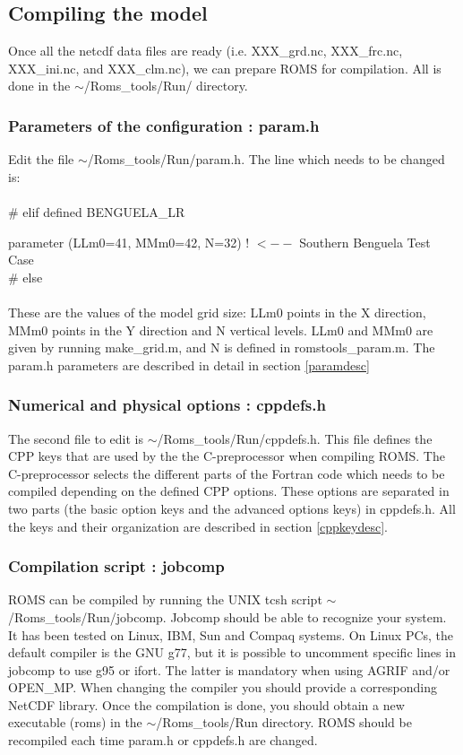 \subsection{Compiling the model}

Once all the netcdf data files are ready (i.e. XXX\_grd.nc,
XXX\_frc.nc, XXX\_ini.nc, and XXX\_clm.nc), we can prepare ROMS for
compilation. All is done in the $\sim$/Roms\_tools/Run/ directory.

\subsubsection{Parameters of the configuration : param.h}
Edit the file $\sim$/Roms\_tools/Run/param.h.
The line which needs to be changed is:\\\\
\# elif defined BENGUELA\_LR

parameter (LLm0=41, MMm0=42, N=32)  ! $<--$ Southern Benguela Test Case\\
\#  else\\
\\
These are the values of the model grid size: LLm0 points in the X direction, MMm0
points in the Y direction and N vertical levels.  LLm0 and MMm0 are given by running
make\_grid.m, and N is defined in romstools\_param.m. The param.h parameters are
described in detail in section \ref{paramdesc}

\subsubsection{Numerical and physical options : cppdefs.h}
The second file to edit is $\sim$/Roms\_tools/Run/cppdefs.h.  This file defines the
CPP keys that are used by the the C-preprocessor when compiling ROMS. The
C-preprocessor selects the different parts of the Fortran code which needs to be
compiled depending on the defined CPP options. These options are separated in two
parts (the basic option keys and the advanced options keys) in cppdefs.h. All the
keys and their organization are described in section \ref{cppkeydesc}. \\

\subsubsection{Compilation script :  jobcomp}
ROMS can be compiled by running the UNIX tcsh script $\sim$/Roms\_tools/Run/jobcomp.
Jobcomp should be able to recognize your system. It has been tested on Linux, IBM,
Sun and Compaq systems. On Linux PCs, the default compiler is the GNU g77, but it is
possible to uncomment specific lines in jobcomp to use g95 or ifort.  The latter is
mandatory when using AGRIF and/or OPEN\_MP.  When changing the compiler you should
provide a corresponding NetCDF library.  Once the compilation is done, you should
obtain a new executable (roms) in the $\sim$/Roms\_tools/Run directory.  ROMS should
be recompiled each time param.h or cppdefs.h are changed.

